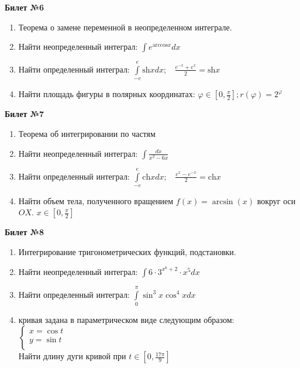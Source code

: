 \documentclass[a4paper, 12pt]{article}
\begin{document}
\begin{center}
	\textbf{Билет №6}
\end{center}
\begin{enumerate}
	\item Теорема о замене переменной в неопределенном интеграле.
	\item Найти неопределенный интеграл: $\displaystyle \int{e^{\text{arccos}x} dx}$
	\item Найти определенный интеграл: $\displaystyle \int\limits_{-e}^{e}{\text{sh}{x} dx};\ \ \ \  \frac{e^{-x}+e^x}{2} = \text{sh}{x}$
	\item Найти площадь фигуры в полярных координатах: $\displaystyle \varphi \in \left[0, \frac{\pi}{2}\right]; r(\varphi) = 2^\varphi$
\end{enumerate}

\begin{center}
	\textbf{Билет №7}
\end{center}
\begin{enumerate}
	\item Теорема об интегрировании по частям 
	\item Найти неопределенный интеграл: $\displaystyle \int{\frac{dx}{x^2 - 6x}}$
	\item Найти определенный интеграл: $\displaystyle \int\limits_{-e}^{e}{\text{ch}{x}dx}; \ \ \ \ \frac{e^{x} - e^{-x}}{2} = \text{ch}{x}$
	\item Найти объем тела, полученного вращением $\displaystyle f(x) = \arcsin(x)$ вокруг оси $OX$. $\displaystyle x \in \left[0, \frac{\pi}{2}\right]$
\end{enumerate}

\begin{center}
	\textbf{Билет №8}
\end{center}
\begin{enumerate}
	\item Интегрирование тригонометрических функций, подстановки.
	\item Найти неопределенный интеграл: $\displaystyle \int{6 \cdot 3^{x^6 + 2} \cdot x^5 dx}$
	\item Найти определенный интеграл: $\displaystyle \int\limits_{0}^{\pi}{\sin^3{x}\cos^4{x}dx}$
	\item кривая задана в параметрическом виде следующим образом: \\
	$
	\begin{cases}
		x = \cos{t} \\
		y=\sin{t} \\
	\end{cases}
	$
	\\
	Найти длину дуги кривой при $\displaystyle t \in \left[0, \frac{17\pi}{9}\right]$
\end{enumerate}
\end{document}
